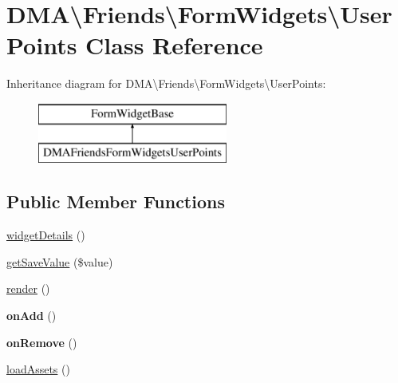 \hypertarget{classDMA_1_1Friends_1_1FormWidgets_1_1UserPoints}{}\section{D\+M\+A\textbackslash{}Friends\textbackslash{}Form\+Widgets\textbackslash{}User\+Points Class Reference}
\label{classDMA_1_1Friends_1_1FormWidgets_1_1UserPoints}
Inheritance diagram for D\+M\+A\textbackslash{}Friends\textbackslash{}Form\+Widgets\textbackslash{}User\+Points\+:\begin{figure}[H]
\begin{center}
\leavevmode
\includegraphics[height=2.000000cm]{d8/df1/classDMA_1_1Friends_1_1FormWidgets_1_1UserPoints}
\end{center}
\end{figure}
\subsection*{Public Member Functions}
\begin{DoxyCompactItemize}
\item 
\hyperlink{classDMA_1_1Friends_1_1FormWidgets_1_1UserPoints_a2f5e6b76ab55e44a579486785b7b41c7}{widget\+Details} ()
\item 
\hyperlink{classDMA_1_1Friends_1_1FormWidgets_1_1UserPoints_afc3a3971957b5aa008327001f195979f}{get\+Save\+Value} (\$value)
\item 
\hyperlink{classDMA_1_1Friends_1_1FormWidgets_1_1UserPoints_a910893df29c6c508ced5d84185d22bcb}{render} ()
\item 
\hypertarget{classDMA_1_1Friends_1_1FormWidgets_1_1UserPoints_a19e5e2cce310f6c8547f7b50f42c1d0f}{}{\bfseries on\+Add} ()\label{classDMA_1_1Friends_1_1FormWidgets_1_1UserPoints_a19e5e2cce310f6c8547f7b50f42c1d0f}

\item 
\hypertarget{classDMA_1_1Friends_1_1FormWidgets_1_1UserPoints_a645fcb235fd962cd346978a10b892dcb}{}{\bfseries on\+Remove} ()\label{classDMA_1_1Friends_1_1FormWidgets_1_1UserPoints_a645fcb235fd962cd346978a10b892dcb}

\item 
\hyperlink{classDMA_1_1Friends_1_1FormWidgets_1_1UserPoints_adbaf2876c58fc27d29147c94893696b1}{load\+Assets} ()
\end{DoxyCompactItemize}


